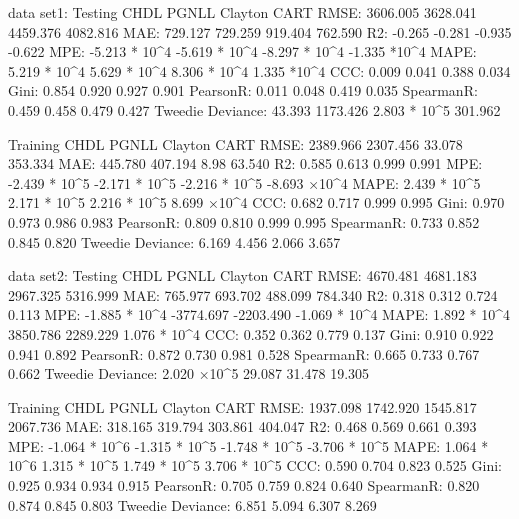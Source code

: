 data set1:
Testing
							CHDL			PGNLL			Clayton			CART		
RMSE: 						3606.005			3628.041			4459.376			4082.816			
MAE: 						729.127			729.259			919.404			762.590
R2: 							-0.265			-0.281			-0.935			-0.622
MPE:						-5.213 * 10^4	 	-5.619 * 10^4		-8.297 * 10^4		-1.335 *10^4
MAPE: 						5.219 * 10^4		5.629 * 10^4		8.306 * 10^4		1.335 *10^4
CCC: 						0.009			0.041			0.388			0.034
Gini:							0.854			0.920			0.927			0.901
PearsonR: 					0.011			0.048			0.419			0.035
SpearmanR: 					0.459			0.458			0.479			0.427
Tweedie Deviance: 				43.393			1173.426			2.803 * 10^5		301.962

Training
							CHDL			PGNLL			Clayton			CART		
RMSE: 						2389.966			2307.456			33.078			353.334
MAE: 						445.780			407.194			8.98				63.540
R2: 							0.585			0.613			0.999			0.991
MPE: 						-2.439 * 10^5		-2.171 * 10^5		-2.216 * 10^5		-8.693 ×10^4
MAPE: 						2.439 * 10^5		2.171 * 10^5		2.216 * 10^5		8.699 ×10^4
CCC: 						0.682			0.717			0.999			0.995
Gini: 							0.970			0.973			0.986			0.983
PearsonR: 					0.809			0.810			0.999			0.995
SpearmanR: 					0.733			0.852			0.845			0.820
Tweedie Deviance: 				6.169			4.456			2.066			3.657


data set2:
Testing
							CHDL			PGNLL			Clayton			CART	
RMSE: 						4670.481			4681.183			2967.325			5316.999
MAE: 						765.977			693.702			488.099			784.340
R2: 							0.318			0.312			0.724			0.113
MPE: 						-1.885 * 10^4		-3774.697			-2203.490			-1.069 * 10^4
MAPE: 						1.892 * 10^4		3850.786			2289.229			1.076 * 10^4
CCC: 						0.352			0.362			0.779			0.137
Gini: 							0.910			0.922			0.941			0.892
PearsonR: 					0.872			0.730			0.981			0.528
SpearmanR: 					0.665			0.733			0.767			0.662
Tweedie Deviance: 				2.020 ×10^5		29.087			31.478			19.305

Training 
							CHDL			PGNLL			Clayton			CART	
RMSE: 						1937.098			1742.920			1545.817			2067.736
MAE: 						318.165			319.794			303.861			404.047
R2: 							0.468			0.569			0.661			0.393
MPE:						-1.064 * 10^6		-1.315 * 10^5	         -1.748 * 10^5		-3.706  * 10^5
MAPE: 						1.064 * 10^6		1.315  * 10^5		1.749 * 10^5		3.706  * 10^5
CCC: 						0.590			0.704			0.823			0.525
Gini: 							0.925			0.934			0.934			0.915
PearsonR: 					0.705			0.759			0.824			0.640
SpearmanR: 					0.820			0.874			0.845			0.803
Tweedie Deviance: 				6.851			5.094			6.307			8.269